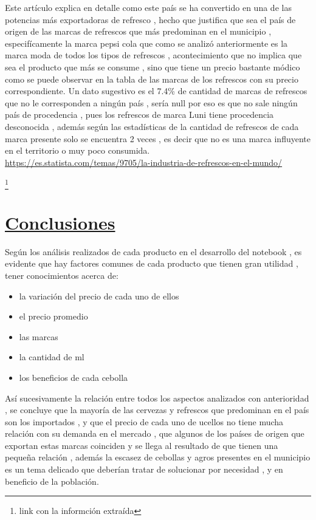 \documentclass[twocolumn,12pt]{article}
\begin{document}
Este artículo explica en detalle como este país se ha convertido en una de las potencias más exportadoras de refresco , hecho que justifica que sea el país de origen de las marcas de refrescos que más predominan en el municipio , especifícamente la marca pepsi cola que como se analizó anteriormente es la marca moda de todos los tipos de refrescos , acontecimiento que no implica que sea el producto que  más  se consume , sino que tiene un precio bastante módico  como se puede observar en la tabla de las marcas de los refrescos con su precio correspondiente.
Un dato sugestivo es el 7.4\% de cantidad de marcas de refrescos que no le corresponden a ningún país , sería null por eso es que no sale ningún país de procedencia , pues los refrescos de marca Luni tiene procedencia desconocida , además según las estadísticas de la cantidad de refrescos de cada marca presente solo se encuentra 2 veces , es decir que no es una marca influyente en el territorio o muy poco consumida.\\


\newpage
\url{https://es.statista.com/temas/9705/la-industria-de-refrescos-en-el-mundo/}

\footnote{link con la informción extraída}

\newpage
\section{{\LARGE \underline{Conclusiones}}}

Según los análisis realizados de cada producto en el desarrollo del notebook , es evidente que hay factores comunes de cada producto que tienen gran utilidad , tener conocimientos acerca de:

\begin{itemize}
	\item{la variación del precio de cada uno de ellos}
	\item{el precio promedio}
	\item{las marcas}
	\item{la cantidad de ml}
	\item{los beneficios de cada cebolla}
\end{itemize}
	
Así sucesivamente la relación  entre todos los aspectos analizados con anterioridad , se concluye que la  mayoría de las cervezas y refrescos que predominan en el país son los importados , y que el precio de cada uno de ucellos no tiene mucha relación con su demanda en el mercado , que algunos de los países de origen que exportan estas marcas coinciden y se llega al resultado de que tienen una pequeña relación , además la escasez de cebollas y agros presentes en el municipio es un tema delicado que deberían tratar de solucionar por necesidad  , y en beneficio de la población.


\newpage
\tableofcontents
\end{document}
